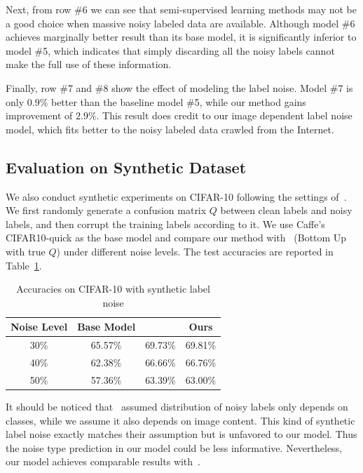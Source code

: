 \documentclass[10pt,twocolumn,letterpaper]{article}
\begin{document}
Next, from row \#6 we can see that semi-supervised learning methods may not be a good choice when massive noisy labeled data are available. Although model \#6 achieves marginally better result than its base model, it is significantly inferior to model \#5, which indicates that simply discarding all the noisy labels cannot make the full use of these information.

Finally, row \#7 and \#8 show the effect of modeling the label noise. Model \#7 is only $0.9\%$ better than the baseline model \#5, while our method gains improvement of $2.9\%$. This result does credit to our image dependent label noise model, which fits better to the noisy labeled data crawled from the Internet.

\subsection{Evaluation on Synthetic Dataset} %
\label{sub:evaluation_on_synthetic_dataset}
We also conduct synthetic experiments on CIFAR-10 following the settings of~\cite{sukhbaatar2014learning}. We first randomly generate a confusion matrix $Q$ between clean labels and noisy labels, and then corrupt the training labels according to it. We use Caffe's CIFAR10-quick as the base model and compare our method with~\cite{sukhbaatar2014learning} (Bottom Up with true $Q$) under different noise levels. The test accuracies are reported in Table~\ref{tab:accuracy_synthetic}.

\begin{table}
\begin{center}
\begin{tabular}{c|c|c|c}
\hline
Noise Level & Base Model & \cite{sukhbaatar2014learning} & Ours \\
\hline\hline
30\% & 65.57\% & 69.73\% & 69.81\% \\
\hline
40\% & 62.38\% & 66.66\% & 66.76\% \\
\hline
50\% & 57.36\% & 63.39\% & 63.00\% \\
\hline
\end{tabular}
\end{center}
\caption{Accuracies on CIFAR-10 with synthetic label noise}
\label{tab:accuracy_synthetic}
\end{table}

It should be noticed that~\cite{sukhbaatar2014learning} assumed distribution of noisy labels only depends on classes, while we assume it also depends on image content. This kind of synthetic label noise exactly matches their assumption but is unfavored to our model. Thus the noise type prediction in our model could be less informative. Nevertheless, our model achieves comparable results with~\cite{sukhbaatar2014learning}.
\end{document}
